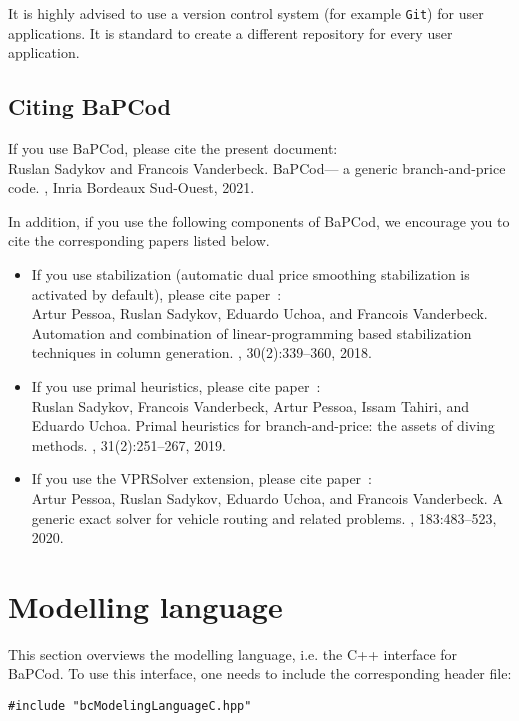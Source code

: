 \documentclass[10pt,a4paper]{article}
\newcommand{\bc}{BaPCod\xspace}
\begin{document}
It is highly advised to use a version control system (for example \verb+Git+) for user applications. It is standard to
create a different repository for every user application.

\subsection{Citing \bc}
\label{sec:citing}  

If you use \bc, please cite the present document:\\
Ruslan Sadykov and Francois Vanderbeck.  \newblock \bc --- a generic branch-and-price code.  , Inria Bordeaux Sud-Ouest, 2021.


In addition, if you use the following components of \bc, we encourage
you to cite the corresponding papers listed below.
\begin{itemize}
\item If you use stabilization (automatic dual price smoothing stabilization is activated by default), please cite
  paper~\cite{PessoaSadykovUchoa:18b}:\\
  Artur Pessoa, Ruslan Sadykov, Eduardo Uchoa, and Francois Vanderbeck.  \newblock Automation and combination of
  linear-programming based stabilization techniques in column generation.  ,
  30(2):339--360, 2018.
\item If you use primal heuristics, please cite paper~\cite{SadykovVanderbecPessoa:19a}: \\
  Ruslan Sadykov, Francois Vanderbeck, Artur Pessoa, Issam Tahiri, and Eduardo Uchoa.  \newblock Primal heuristics for
  branch-and-price: the assets of diving methods.  , 31(2):251--267, 2019.
\item If you use the VPRSolver extension, please cite paper~\cite{PessoaSadykovUchoa:20a}: \\
  Artur Pessoa, Ruslan Sadykov, Eduardo Uchoa, and Francois Vanderbeck.  \newblock A generic exact solver for vehicle
  routing and related problems.  , 183:483--523, 2020.
\end{itemize}

\section{Modelling language}

This section overviews the modelling language, i.e. the C++ interface for \bc. To use this interface, one needs to
include the corresponding header file:
\begin{lstlisting}
#include "bcModelingLanguageC.hpp"
\end{lstlisting}
\end{document}
